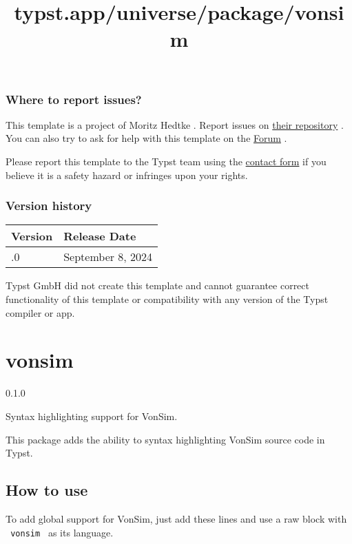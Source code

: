 \subsubsection{Where to report issues?}\label{where-to-report-issues}

This template is a project of Moritz Hedtke . Report issues on
\href{https://github.com/mohe2015/not-tudabeamer-2023}{their repository}
. You can also try to ask for help with this template on the
\href{https://forum.typst.app}{Forum} .

Please report this template to the Typst team using the
\href{https://typst.app/contact}{contact form} if you believe it is a
safety hazard or infringes upon your rights.

\label{versions}
\subsubsection{Version history}\label{version-history}

\begin{longtable}[]{@{}ll@{}}
\toprule\noalign{}
Version & Release Date \\
\midrule\noalign{}
\endhead
\bottomrule\noalign{}
\endlastfoot
0.1.0 & September 8, 2024 \\
\end{longtable}

Typst GmbH did not create this template and cannot guarantee correct
functionality of this template or compatibility with any version of the
Typst compiler or app.


\title{typst.app/universe/package/vonsim}

\label{banner}
\section{vonsim}\label{vonsim}

{ 0.1.0 }

Syntax highlighting support for VonSim.

\label{readme}
This package adds the ability to syntax highlighting VonSim source code
in Typst.

\subsection{How to use}\label{how-to-use}

To add global support for VonSim, just add these lines and use a raw
block with \texttt{\ vonsim\ } as its language.

